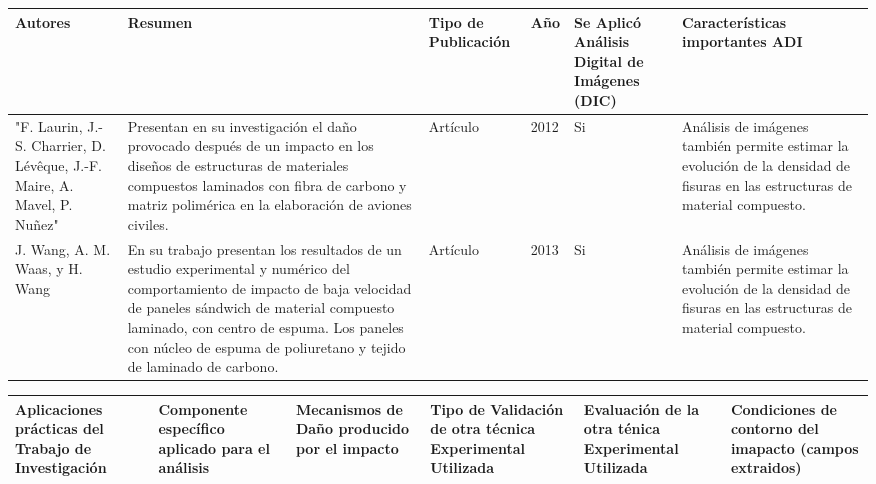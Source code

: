 \documentclass[12pt, a4paper, nofontenc, numbers=endperiod]{apa7}
\begin{document}
{\begin{center}
{{\begin{tabular}{|p{2.5cm}|p{4cm}|p{1cm}|p{0.5cm}|p{1.5cm}|p{3.5cm}|}
				\hline
				\vspace*{5mm}\centering \textbf{Autores} & 	\vspace*{5mm}\centering \textbf{Resumen} & 	\vspace*{2mm}\centering \textbf{Tipo de Publicación} & 	\vspace*{5mm}\centering \textbf{Año} & \centering \textbf{Se Aplicó Análisis Digital de Imágenes (DIC)} & 	{\vspace*{2.5mm}\centering 
					\textbf{Características importantes ADI}} \\
				\hline
				"F. Laurin, 
				J.-S. Charrier, D. Lévêque, J.-F. Maire, A. Mavel, P. Nuñez"
				&Presentan en su investigación el daño provocado después de un impacto en los diseños de estructuras de materiales compuestos laminados con fibra de carbono y matriz polimérica en la elaboración de aviones civiles.
				&Artículo
				&2012
				&Si
				&Análisis de imágenes también permite estimar la evolución de la densidad de fisuras en las estructuras de material compuesto.
				\\
				\hline
				J. Wang, A. M. Waas, y H. Wang
				&En su trabajo presentan los resultados de un estudio experimental y numérico del comportamiento de impacto de baja velocidad de paneles sándwich de material compuesto laminado, con centro de espuma. Los paneles con núcleo de espuma de poliuretano y tejido de laminado de carbono. 
				&Artículo
				&2013
				&Si
				&Análisis de imágenes también permite estimar la evolución de la densidad de fisuras en las estructuras de material compuesto.
				\\
				\hline	
			\end{tabular}
			
		}
		
	}
\end{center}			

\begin{center}
	
	{\scriptsize \singlespacing
		\renewcommand{\multirowsetup}{\centering}	{\renewcommand{\arraystretch}{1.5}
			\begin{tabular}{|p{2cm}|p{2cm}|p{2.5cm}|p{2cm}|p{2cm}|p{2.5cm}|}
				\hline
				\vspace*{0.5mm}\centering  \textbf{Aplicaciones prácticas del Trabajo de Investigación} & \vspace*{0.5mm}\centering  \textbf{Componente específico aplicado para el análisis} & \vspace*{0.5mm}\centering  \textbf{Mecanismos de Daño producido por el impacto} & \vspace*{0.5mm}\centering  \textbf{Tipo de Validación de otra técnica Experimental Utilizada} & \vspace*{0.5mm}\centering \textbf{Evaluación de la otra ténica Experimental Utilizada} &
				{\vspace*{0.5mm}\centering \textbf{Condiciones de contorno del imapacto (campos extraidos)}}	\\
				\hline
				

\end{tabular}}}
\end{center}}
\end{document}

